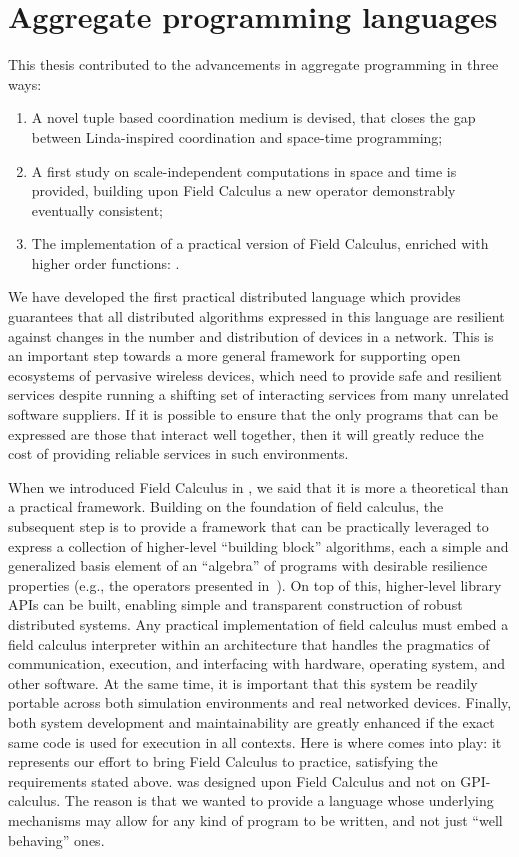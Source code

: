 \documentclass[12pt,a4paper,twoside,openright]{book}
\begin{document}
\section{Aggregate programming languages}

This thesis contributed to the advancements in aggregate programming in three ways:
\begin{enumerate}
 \item A novel tuple based coordination medium is devised, that closes the gap between Linda-inspired coordination and space-time programming;
 \item A first study on scale-independent computations in space and time is provided, building upon Field Calculus a new operator demonstrably eventually consistent;
 \item The implementation of a practical version of Field Calculus, enriched with higher order functions: \protelis{}.
\end{enumerate}

We have developed the first practical distributed language which provides guarantees that all distributed algorithms expressed in this language are resilient against changes in the number and distribution of devices in a network.
%
This is an important step towards a more general framework for supporting open ecosystems of pervasive wireless devices, which need to provide safe and resilient services despite running a shifting set of interacting services from many unrelated software suppliers.
%
If it is possible to ensure that the only programs that can be expressed are those that interact well together, then it will greatly reduce the cost of providing reliable services in such environments.

When we introduced Field Calculus in , we said that it is more a theoretical than a practical framework.
%
Building on the foundation of field calculus, the subsequent step is to provide a framework that can be practically leveraged to express a collection of higher-level ``building block'' algorithms, each a simple and generalized basis element of an ``algebra'' of programs with desirable resilience properties (e.g., the operators presented in~\cite{BV-FOCAS2014}).
%
On top of this, higher-level library APIs can be built, enabling simple and transparent construction of robust distributed systems.
%
Any practical implementation of field calculus must embed a field calculus interpreter within an architecture that handles the pragmatics of communication, execution, and interfacing with hardware, operating system, and other software.
%
At the same time, it is important that this system be readily portable across both simulation environments and real networked devices.
%
Finally, both system development and maintainability are greatly enhanced if the exact same code is used for execution in all contexts.
%
Here is where \protelis{} comes into play: it represents our effort to bring Field Calculus to practice, satisfying the requirements stated above.
%
\protelis{} was designed upon Field Calculus and not on GPI-calculus.
%
The reason is that we wanted to provide a language whose underlying mechanisms may allow for any kind of program to be written, and not just ``well behaving'' ones.
\end{document}
